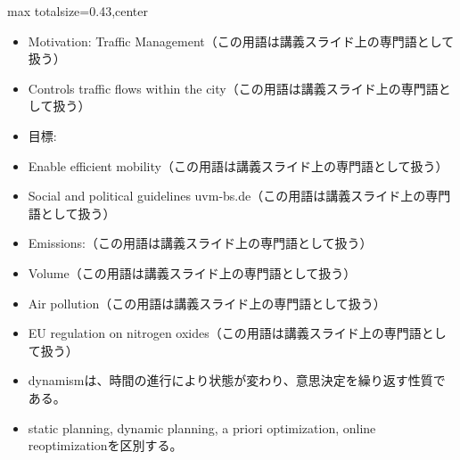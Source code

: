\clearpage
{}
\begin{minipage}[t]{0.405\textwidth}
\begin{adjustbox}{max totalsize={\textwidth}{0.43\textheight},center}
\begin{minipage}{\textwidth}\scriptsize
{}\begin{itemize}
\item Motivation: Traffic Management（この用語は講義スライド上の専門語として扱う）
\item Controls traffic flows within the city（この用語は講義スライド上の専門語として扱う）
\item 目標:
\item Enable efficient mobility（この用語は講義スライド上の専門語として扱う）
\item Social and political guidelines uvm-bs.de（この用語は講義スライド上の専門語として扱う）
\item Emissions:（この用語は講義スライド上の専門語として扱う）
\item Volume（この用語は講義スライド上の専門語として扱う）
\item Air pollution（この用語は講義スライド上の専門語として扱う）
\item EU regulation on nitrogen oxides（この用語は講義スライド上の専門語として扱う）
\end{itemize}\begin{itemize}
\item dynamismは、時間の進行により状態が変わり、意思決定を繰り返す性質である。
\item static planning, dynamic planning, a priori optimization, online reoptimizationを区別する。
\end{itemize}
\end{minipage}
\end{adjustbox}
\end{minipage}\hfill
